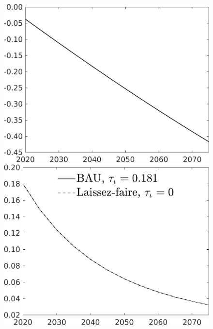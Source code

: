 \documentclass[12pt]{article}
\begin{document}
\begin{figure}[h!!]
\begin{minipage}[]{0.32\textwidth}
		\end{minipage}
	\begin{minipage}[]{0.32\textwidth}
	\includegraphics[width=1\textwidth]{../../codding_model/own_basedOnFried/optimalPol_010922_revision/figures/all_13Sept22/CompTaul_Equlab_LFBAUPer_Reg0_AgAf_spillover0_nsk0_xgr0_knspil1_sep1_countec0_GovRev0_etaa0.79.png}
\end{minipage}
	\begin{minipage}[]{0.32\textwidth}
		\includegraphics[width=1\textwidth]{../../codding_model/own_basedOnFried/optimalPol_010922_revision/figures/all_13Sept22/CompTaul_Equlab_LFBAU_Reg0_pf_spillover0_nsk0_xgr0_knspil1_sep1_countec0_GovRev0_etaa0.79_lgd1.png}

\end{minipage}
\end{figure}
\end{document}
